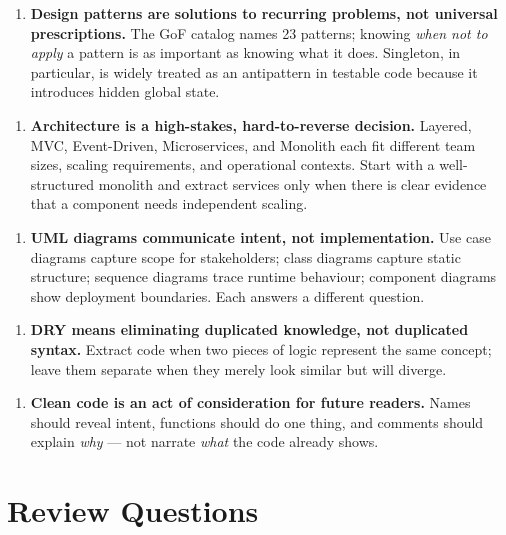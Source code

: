 \documentclass[11pt,a4paper]{book}
\begin{document}
\begin{enumerate}
  \item \textbf{Design patterns are solutions to recurring problems, not universal prescriptions.} The GoF catalog names 23 patterns; knowing \textit{when not to apply} a pattern is as important as knowing what it does. Singleton, in particular, is widely treated as an antipattern in testable code because it introduces hidden global state.
\end{enumerate}

\begin{enumerate}
  \item \textbf{Architecture is a high-stakes, hard-to-reverse decision.} Layered, MVC, Event-Driven, Microservices, and Monolith each fit different team sizes, scaling requirements, and operational contexts. Start with a well-structured monolith and extract services only when there is clear evidence that a component needs independent scaling.
\end{enumerate}

\begin{enumerate}
  \item \textbf{UML diagrams communicate intent, not implementation.} Use case diagrams capture scope for stakeholders; class diagrams capture static structure; sequence diagrams trace runtime behaviour; component diagrams show deployment boundaries. Each answers a different question.
\end{enumerate}

\begin{enumerate}
  \item \textbf{DRY means eliminating duplicated knowledge, not duplicated syntax.} Extract code when two pieces of logic represent the same concept; leave them separate when they merely look similar but will diverge.
\end{enumerate}

\begin{enumerate}
  \item \textbf{Clean code is an act of consideration for future readers.} Names should reveal intent, functions should do one thing, and comments should explain \textit{why} --- not narrate \textit{what} the code already shows.
\end{enumerate}

\medskip

\section{Review Questions}
\end{document}
